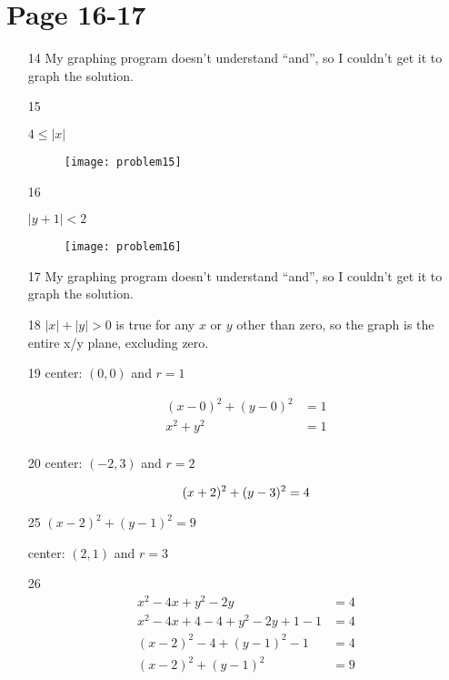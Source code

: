 \documentclass[fleqn,addpoints]{exam}
\begin{document}
\section{Page 16-17}
\begin{itemize}

\item[14]
My graphing program doesn't understand ``and'', so I couldn't get it to graph the solution.

\item[15]

$4 \leq |x|$

\begin{figure}[H]
  \texttt{[image: problem15]}
\end{figure}

\pagebreak

\item[16]

$|y+1| < 2$

\begin{figure}[H]
  \texttt{[image: problem16]}
\end{figure}

\item[17]
My graphing program doesn't understand ``and'', so I couldn't get it to graph the solution.

\item[18]
$|x| + |y| > 0$ is true for any $x$ or $y$ other than zero, so the graph is the entire x/y plane, excluding zero.

\item[19]
center: $(0, 0)$ and $r=1$

\begin{align*}
  (x-0)^2 + (y-0)^2 &= 1 \\
  x^2 + y^2 &= 1 \\
\end{align*}

\item[20]
center: $(-2, 3)$ and $r=2$

\[
  (x+2)^2 + (y-3)^2 = 4 \\
\]

\item[25]
$(x-2)^2 + (y-1)^2 = 9$

center: $(2, 1)$ and $r=3$

\item[26]
\begin{align*}
  x^2 - 4x + y^2 -2y &= 4 \\
  x^2 - 4x + 4 - 4 + y^2 -2y + 1 -1 &= 4 \\
  (x-2)^2 - 4 + (y-1)^2 -1 &= 4 \\
  (x-2)^2 + (y-1)^2 &= 9 \\
\end{align*}


\end{itemize}
\end{document}
